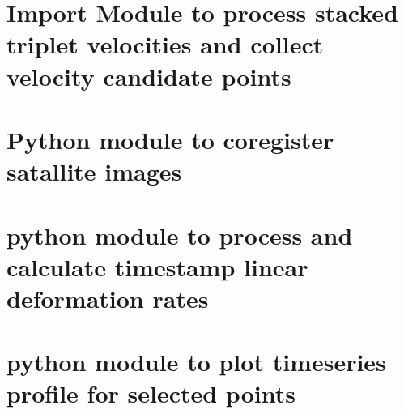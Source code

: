 \documentclass[letterpaper,10pt]{sphinxmanual}
\begin{document}
\section{Import Module to process stacked triplet velocities and collect velocity candidate points}
\label{\detokenize{README:import-module-to-process-stacked-triplet-velocities-and-collect-velocity-candidate-points}}
\begin{sphinxVerbatim}[commandchars=\\\{\}]
   
\end{sphinxVerbatim}


\section{Python module to coregister satallite images}
\label{\detokenize{README:python-module-to-coregister-satallite-images}}
\begin{sphinxVerbatim}[commandchars=\\\{\}]
     
\end{sphinxVerbatim}


\section{python module to process and calculate timestamp linear deformation rates}
\label{\detokenize{README:python-module-to-process-and-calculate-timestamp-linear-deformation-rates}}
\begin{sphinxVerbatim}[commandchars=\\\{\}]
    
\end{sphinxVerbatim}


\section{python module to plot timeseries profile for selected points}
\label{\detokenize{README:python-module-to-plot-timeseries-profile-for-selected-points}}
\begin{sphinxVerbatim}[commandchars=\\\{\}]
     

\end{sphinxVerbatim}
\end{document}
